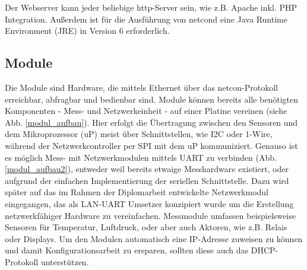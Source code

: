 \documentclass[a4paper,14pt,headsepline]{scrartcl}
\begin{document}
Der Webserver kann jeder beliebige http-Server sein, wie z.B. Apache inkl. PHP Integration. Außerdem ist für die Ausführung von netcond eine Java Runtime Environment (JRE) in Version 6 erforderlich. 

\newpage

\begin{figure}[h]
\begin{center}
\end{center}
\end{figure}


\newpage

\subsection{Module}

Die Module sind Hardware, die mittels Ethernet über das netcon-Protokoll erreichbar, abfragbar und bedienbar sind. Module können bereits alle benötigten Komponenten - Mess- und Netzwerkeinheit - auf einer Platine vereinen (siehe Abb. \ref{modul_aufbau}). Hier erfolgt die Übertragung zwischen den Sensoren und dem Mikroprozessor (uP) meist über Schnittstellen, wie I2C oder 1-Wire, während der Netzwerkcontroller per SPI mit dem uP kommuniziert. Genauso ist es möglich Mess- mit Netzwerkmodulen mittels UART zu verbinden (Abb. \ref{modul_aufbau2}), entweder weil bereits etwaige Messhardware existiert, oder aufgrund der einfachen Implementierung der seriellen Schnittstelle. Dazu wird später auf das im Rahmen der Diplomarbeit entwickelte Netzwerkmodul eingegangen, das als LAN-UART Umsetzer konzipiert wurde um die Erstellung netzwerkfähiger Hardware zu vereinfachen. Messmodule umfassen beispielsweise Sensoren für Temperatur, Luftdruck, oder aber auch Aktoren, wie z.B. Relais oder Displays. Um den Modulen automatisch eine IP-Adresse zuweisen zu können und damit Konfigurationsarbeit zu ersparen, sollten diese auch das DHCP-Protokoll unterstützen. 

\begin{figure}[h]
\begin{center}
\end{center}
\end{figure}
\end{document}
